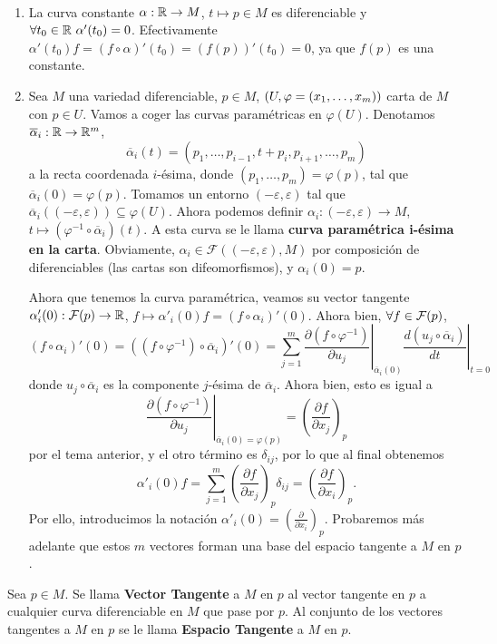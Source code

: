 \documentclass[Cursovd_portada.tex]{subfiles}
\begin{document}
\begin{ejs}\
\begin{enumerate}
\item La curva constante $\alpha:\mathbb{R}\to M$, $t\mapsto p\in M$ es diferenciable y $\forall t_0\in\R\ \alpha'(t_0)=0$. Efectivamente $\alpha'(t_0)f=(f\circ\alpha)'(t_0)=(f(p))'(t_0)=0$, ya que $f(p)$ es una constante.
\item Sea $M$ una variedad diferenciable, $p\in M$, $(U,\varphi=(x_1,\dotsc,x_{m}))$ carta de $M$ con $p\in U$. Vamos a coger las curvas paramétricas en $\varphi(U)$. Denotamos $\overline{\alpha}_i:\mathbb{R}\to\mathbb{R}^m$, $$\overline{\alpha}_i(t)=(p_1,\dots,p_{i-1},t+p_i,p_{i+1},\dots,p_m)$$ a la recta coordenada $i$-ésima, donde $(p_1,\dots,p_m)=\varphi(p)$, tal que $\overline{\alpha}_i(0)=\varphi(p)$. Tomamos un entorno $(-\varepsilon,\varepsilon)$ tal que $\overline{\alpha}_i((-\varepsilon,\varepsilon))\subseteq\varphi(U)$. Ahora podemos definir $\alpha_i:(-\varepsilon,\varepsilon)\to M$, $t\mapsto (\varphi^{-1}\circ\overline{\alpha}_i)(t)$. A esta curva se le llama \textbf{curva paramétrica i-ésima en la carta}. Obviamente, $\alpha_i\in\mathcal{F}((-\varepsilon,\varepsilon),M)$ por composición de diferenciables (las cartas son difeomorfismos), y $\alpha_i(0)=p$.

Ahora que tenemos la curva paramétrica, veamos su vector tangente $\alpha'_i(0):\mathcal{F}(p)\to\mathbb{R}$, $f\mapsto \alpha'_i(0)f=(f\circ\alpha_i)'(0)$. Ahora bien, $\forall f\in\mathcal{F}(p)$, 
$$(f\circ\alpha_i)'(0)=((f\circ\varphi^{-1})\circ\overline{\alpha}_i)'(0)=\sum_{j=1}^m \left.\frac{\partial (f\circ\varphi^{-1})}{\partial u_j}\right|_{\overline{\alpha}_i(0)}\left.\frac{d(u_j\circ\overline{\alpha}_i)}{dt}\right|_{t=0}$$
donde $u_j\circ\overline{\alpha}_i$ es la componente $j$-ésima de $\overline{\alpha}_i$. Ahora bien, esto es igual a
$$
\left.\frac{\partial (f\circ\varphi^{-1})}{\partial u_j}\right|_{\overline{\alpha}_i(0)=\varphi(p)}=\left(\frac{\partial f}{\partial x_j}\right)_p
$$
por el tema anterior, y el otro término es $\delta_{ij}$, por lo que al final obtenemos
$$
\alpha'_i(0)f=\sum_{j=1}^m\left(\frac{\partial f}{\partial x_j}\right)_p\delta_{ij}=\left(\frac{\partial f}{\partial x_i}\right)_p.
$$
Por ello, introducimos la notación $\alpha'_i(0)=\left(\frac{\partial}{\partial x_i}\right)_p$. Probaremos más adelante que estos $m$ vectores forman una base del espacio tangente a $M$ en $p$.
\end{enumerate}
\end{ejs}

\begin{defi}
Sea $p\in M$. Se llama {\bf Vector Tangente} a $M$ en $p$ al vector tangente en $p$ a cualquier curva
diferenciable en $M$ que pase por $p$. Al conjunto de los vectores tangentes a $M$ en $p$ se le llama {\bf Espacio
Tangente} a $M$ en $p$.
\end{defi}
\end{document}
